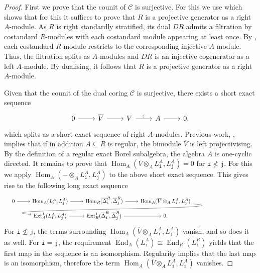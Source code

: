 \documentclass[12pt,a4paper]{amsart}
\theoremstyle{plain}
\theoremstyle{definition}
\numberwithin{equation}{thm}
\DeclareMathOperator{\Hom}{Hom}
\DeclareMathOperator{\Ext}{Ext}
\DeclareMathOperator{\End}{End}
\begin{document}
\begin{proof}
First we prove that the counit of $\mathcal{C}$ is surjective. For this we use \cite[Theorem 2.5 (i)]{BKK20} which shows that for this it suffices to prove that $R$ is a projective generator as a right $A$-module.  As $R$ is right standardly stratified, its dual $DR$ admits a filtration by costandard $R$-modules with each costandard module appearing at least once. By \cite[Proposition 4.5]{CK26}, each costandard $R$-module restricts to the corresponding injective $A$-module. Thus, the filtration splits as $A$-modules and $DR$ is an injective cogenerator as a left $A$-module. By dualising, it follows that $R$ is a projective generator as a right $A$-module. 

Given that the counit of the dual coring $\mathcal{C}$ is surjective, there exists a short exact sequence 
\[
\begin{tikzcd}
0\arrow{r} &\overline{V}\arrow{r} &V\arrow{r}{\varepsilon} &A\arrow{r} &0,    
\end{tikzcd}
\]
which splits as a short exact sequence of right $A$-modules. Previous work, \cite[Theorem 2.13]{BKK20}, implies that if in addition $A\subseteq R$ is regular, the bimodule $\overline{V}$ is left projectivising. By the definition of a regular exact Borel subalgebra, the algebra $A$ is one-cyclic directed. It remains to prove that $\Hom_A(\overline{V}\otimes_A L_\mathtt{i}^A,L_\mathtt{j}^A)=0$ for $\mathtt{i}\nless  \mathtt{j}$. For this we apply $\Hom_A(-\otimes_A L_\mathtt{i}^A,L_\mathtt{j}^A)$ to the above short exact sequence. This gives rise to the following long exact sequence
\[
\hspace{-2.4cm}
\begin{tikzcd}[row sep = 1ex]
0\arrow{r} &\Hom_A(L_\mathtt{i}^A, L_\mathtt{j}^A)\arrow{r} &\Hom_R(\overline{\Delta}_\mathtt{i}^R,\overline{\Delta}_\mathtt{j}^R)\arrow{r} &\Hom_A(\overline{V}\otimes_A L_\mathtt{i}^A,L_\mathtt{j}^A) \arrow[out=-5,
    in=175, looseness=1]{lld}\\
&\Ext^1_A(L_\mathtt{i}^A,L_\mathtt{j}^A)\arrow{r} &\Ext^1_R(\overline{\Delta}_\mathtt{i}^R,\overline{\Delta}_\mathtt{j}^R)\arrow{r} &0.
\end{tikzcd}
\]
For $\mathtt{i}\nleq \mathtt{j}$, the terms surrounding $\Hom_A(\overline{V}\otimes_A L_\mathtt{i}^A,L_\mathtt{j}^A)$ vanish, and so does it as well. For $\mathtt{i}=\mathtt{j}$, the requirement $\End_A(L_\mathtt{i}^A)\cong \End_R(L_\mathtt{i}^R)$ yields that the first map in the sequence is an isomorphism. Regularity implies that the last map is an isomorphism, therefore the term $\Hom_A(\overline{V}\otimes_A L_\mathtt{i}^A,L_\mathtt{i}^A)$ vanishes. 
\end{proof}
\end{document}
